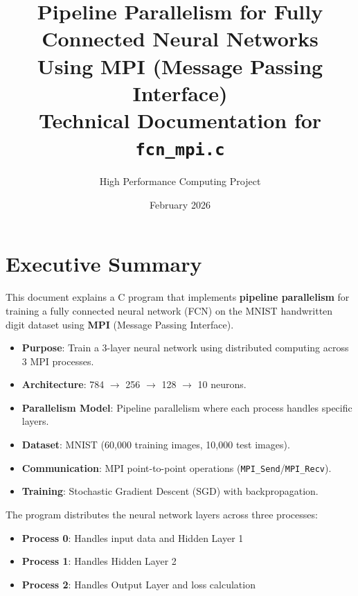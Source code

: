 \documentclass[11pt,a4paper]{article}
\title{%
    \textbf{Pipeline Parallelism for Fully Connected Neural Networks} \\
    \large Using MPI (Message Passing Interface) \\
    \vspace{0.5cm}
    \normalsize Technical Documentation for \texttt{fcn\_mpi.c}
}
\author{High Performance Computing Project}
\date{February 2026}
\begin{document}
\maketitle
\tableofcontents
\newpage

\section{Executive Summary}

This document explains a C program that implements \textbf{pipeline parallelism} for training a fully connected neural network (FCN) on the MNIST handwritten digit dataset using \textbf{MPI} (Message Passing Interface).

\begin{tcolorbox}[colback=blue!5!white,colframe=blue!75!black,title=Key Points]
\begin{itemize}[noitemsep]
    \item \textbf{Purpose}: Train a 3-layer neural network using distributed computing across 3 MPI processes.
    \item \textbf{Architecture}: 784 $\rightarrow$ 256 $\rightarrow$ 128 $\rightarrow$ 10 neurons.
    \item \textbf{Parallelism Model}: Pipeline parallelism where each process handles specific layers.
    \item \textbf{Dataset}: MNIST (60,000 training images, 10,000 test images).
    \item \textbf{Communication}: MPI point-to-point operations (\texttt{MPI\_Send}/\texttt{MPI\_Recv}).
    \item \textbf{Training}: Stochastic Gradient Descent (SGD) with backpropagation.
\end{itemize}
\end{tcolorbox}

The program distributes the neural network layers across three processes:
\begin{itemize}
    \item \textbf{Process 0}: Handles input data and Hidden Layer 1
    \item \textbf{Process 1}: Handles Hidden Layer 2
    \item \textbf{Process 2}: Handles Output Layer and loss calculation
\end{itemize}

\end{document}
